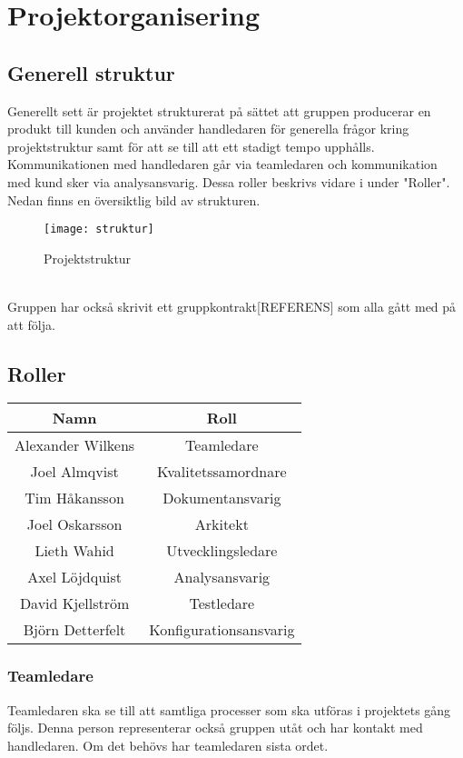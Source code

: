 \section{Projektorganisering}
\subsection{Generell struktur}
Generellt sett är projektet strukturerat på sättet att gruppen producerar en produkt till kunden och använder handledaren för generella frågor kring projektstruktur samt för att se till att ett stadigt tempo upphålls. Kommunikationen med handledaren går via teamledaren och kommunikation med kund sker via analysansvarig. Dessa roller beskrivs vidare i under "Roller". Nedan finns en översiktlig bild av strukturen.
\begin{figure}[h]
    \centering
    \texttt{[image: struktur]}
    \caption{Projektstruktur}
    \label{fig:struktur}
\end{figure}\\
Gruppen har också skrivit ett gruppkontrakt[REFERENS] som alla gått med på att följa.


\subsection{Roller}
\begin{center}
    \begin{tabular}{| c | c |}
        \hline
        \textbf{Namn} & \textbf{Roll} \\
        \hline
        \centering Alexander Wilkens & Teamledare\\
        \hline
        \centering Joel Almqvist & Kvalitetssamordnare\\
        \hline
        \centering Tim Håkansson & Dokumentansvarig\\
        \hline
        \centering Joel Oskarsson & Arkitekt\\
        \hline
        \centering Lieth Wahid & Utvecklingsledare\\
        \hline
        \centering Axel Löjdquist & Analysansvarig\\
        \hline
        \centering David Kjellström & Testledare\\
        \hline
        \centering Björn Detterfelt & Konfigurationsansvarig\\
        \hline
    \end{tabular}
\end{center}
\subsubsection*{Teamledare}
Teamledaren ska se till att samtliga processer som ska utföras i projektets gång följs. Denna person representerar också gruppen utåt och har kontakt med handledaren. Om det behövs har teamledaren sista ordet.

